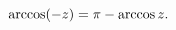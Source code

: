 \[\mathop{\mathrm{arccos}\/}\nolimits\!\left(-z\right)=\pi-\mathop{\mathrm{%
arccos}\/}\nolimits z.\]